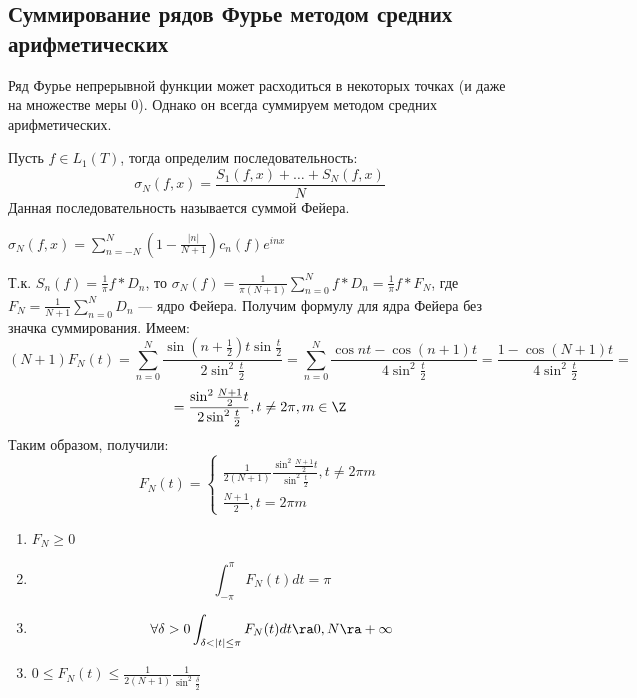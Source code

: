 \subsection{Суммирование рядов Фурье методом средних арифметических}

Ряд Фурье непрерывной функции может расходиться в некоторых точках (и даже на множестве меры \(0\)). Однако он всегда суммируем методом средних арифметических.

\begin{definition}
    Пусть \(f \in L_1(T)\), тогда определим последовательность:
    \[\sigma_N(f, x) = \frac{S_1(f, x) + \dots + S_N(f, x)}{N}\]
    Данная последовательность называется суммой Фейера.
\end{definition}

\begin{note}
    \(\sigma_N(f, x) = \sum_{n = -N}^N\left( 1 - \frac{|n|}{N + 1} \right)c_n(f)e^{inx}\)
\end{note}
Т.к. \(S_n(f) = \frac{1}{\pi}f * D_n\), то \(\sigma_N(f) = \frac{1}{\pi(N + 1)}\sum_{n = 0}^N f * D_n = \frac{1}{\pi} f * F_N\), где \(F_N = \frac{1}{N + 1}\sum_{n = 0}^N D_n\) --- ядро Фейера. Получим формулу для ядра Фейера без значка суммирования. Имеем:
\[(N + 1)F_N(t) = \sum_{n = 0}^N \frac{\sin\left( n + \frac{1}{2} \right)t\sin\frac{t}{2}}{2\sin^2\frac{t}{2}} = \sum_{n = 0}^N \frac{\cos nt - \cos(n + 1)t}{4\sin^2\frac{t}{2}} =\frac{1 - \cos(N + 1)t}{4\sin^2\frac{t}{2}} =\]
\[= \frac{\sin^2\frac{N + 1}{2}t}{2\sin^2\frac{t}{2}}, t \ne 2\pi, m \in \Z\]
Таким образом, получили:
\[F_N(t) = \left\{\begin{array}{l}
    \frac{1}{2(N + 1)} \frac{\sin^2 \frac{N + 1}{2}t}{\sin^2 \frac{t}{2}}, t \ne 2\pi m \\
    \frac{N + 1}{2}, t = 2\pi m
\end{array}\right.\]

\begin{note}
    \begin{enumerate}
        \item \(F_N \ge 0\)
        \item \[\int_{-\pi}^\pi F_N(t)dt = \pi\]
        \item \[\forall \delta > 0 \int_{\delta < |t| \le \pi} F_N(t)dt \ra 0, N \ra +\infty\]
    \end{enumerate}
\end{note}
\begin{proposition}
    \begin{enumerate}
        \setcounter{enumi}{2}
        \item \(0 \le F_N(t) \le \frac{1}{2(N + 1)} \frac{1}{\sin^2 \frac{\delta}{2}}\)
    \end{enumerate}
\end{proposition}

